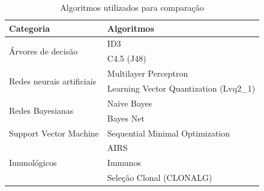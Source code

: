 \vspace{0.5cm}
\begin{table}[h]
    \centering
    \caption{Algoritmos utilizados para comparação}
    \label{tbl:dev_algs}
    \vspace{0.5cm}
    \begin{tabular}{|l|l|}
        \hline
        \textbf{Categoria}                         & \textbf{Algoritmos}                    \\
        \hline
        \multirow{2}{*}{Árvores de decisão}        & ID3                                    \\ \cline{2-2}
                                                   & C4.5 (J48)                             \\
        \hline
        \multirow{2}{*}{Redes neurais artificiais} & Multilayer Perceptron                  \\ \cline{2-2}
                                                   & Learning Vector Quantization (Lvq2\_1) \\
        \hline
        \multirow{2}{*}{Redes Bayesianas}          & Naive Bayes                            \\ \cline{2-2}
                                                   & Bayes Net                              \\
        \hline
        Support Vector Machine                     & Sequential Minimal Optimization        \\
        \hline
        \multirow{3}{*}{Imunológicos}              & AIRS                                   \\ \cline{2-2}
                                                   & Immunos                                \\ \cline{2-2}
                                                   & Seleção Clonal (CLONALG)               \\
        \hline
    \end{tabular}
\end{table}
\vspace{0.5cm}
